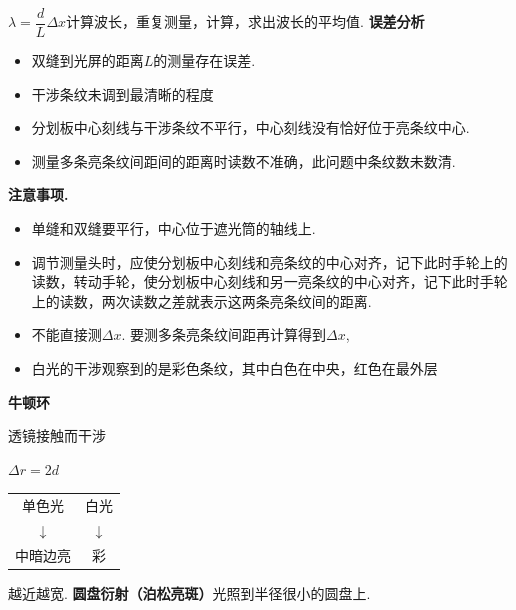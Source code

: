 $\lambda=\dfrac{d}{L}\Delta x$\quad 计算波长，重复测量，计算，求出波长的平均值.
\textbf{误差分析}
\begin{itemize}
\item 双缝到光屏的距离$L$的测量存在误差.
\item 干涉条纹未调到最清晰的程度
\item 分划板中心刻线与干涉条纹不平行，中心刻线没有恰好位于亮条纹中心.
\item 测量多条亮条纹间距间的距离时读数不准确，此问题中条纹数未数清. %
\end{itemize}

\textbf{注意事项.}
\begin{itemize}
\item 单缝和双缝要平行，中心位于遮光筒的轴线上.
\item 调节测量头时，应使分划板中心刻线和亮条纹的中心对齐，记下此时手轮上的读数，转动手轮，使分划板中心刻线和另一亮条纹的中心对齐，记下此时手轮上的读数，两次读数之差就表示这两条亮条纹间的距离.
\item 不能直接测$\Delta x$. 要测多条亮条纹间距再计算得到$\Delta x$,
\item 白光的干涉观察到的是彩色条纹，其中白色在中央，红色在最外层
\end{itemize}
\textbf{牛顿环}

透镜接触而干涉


$\Delta r=2d$ %

\begin{tabular}{@{}c@{\qquad}c@{}}
单色光 & 白光 \\
$\downarrow$ & $\downarrow$ \\
中暗边亮 & 彩 \\
\end{tabular}
\quad 越近越宽. %
\textbf{圆盘衍射（泊松亮斑）}\quad 光照到半径很小的圆盘上.


